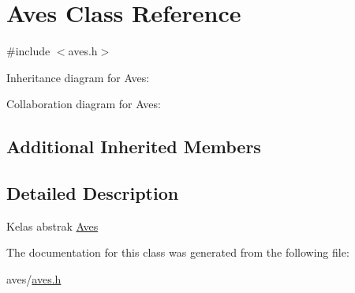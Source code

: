 \hypertarget{classAves}{}\section{Aves Class Reference}
\label{classAves}


{\ttfamily \#include $<$aves.\+h$>$}



Inheritance diagram for Aves\+:


Collaboration diagram for Aves\+:
\subsection*{Additional Inherited Members}


\subsection{Detailed Description}
Kelas abstrak \hyperlink{classAves}{Aves} 

The documentation for this class was generated from the following file\+:\begin{DoxyCompactItemize}
\item 
aves/\hyperlink{aves_8h}{aves.\+h}\end{DoxyCompactItemize}
